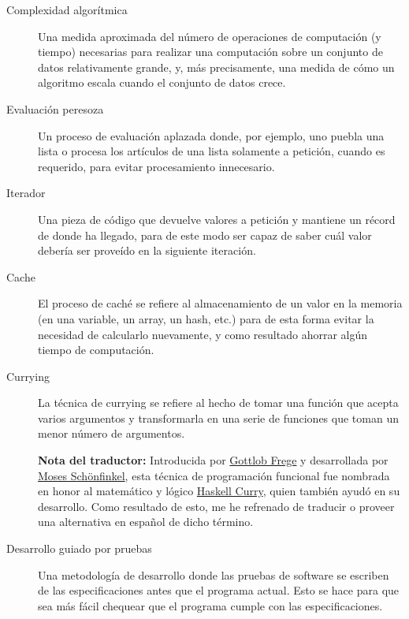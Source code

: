 \begin{description}
\item[Complexidad algorítmica] Una medida aproximada del número de operaciones 
de computación (y tiempo) necesarias para realizar una computación sobre
un conjunto de datos relativamente grande, y, más precisamente, una 
medida de cómo un algoritmo escala cuando el conjunto de datos 
crece.

\item[Evaluación peresoza] Un proceso de evaluación aplazada donde,
por ejemplo, uno puebla una lista o procesa los artículos de una 
lista solamente a petición, cuando es requerido, para evitar 
procesamiento innecesario.

\item[Iterador] Una pieza de código que devuelve valores a petición
y mantiene un récord de donde ha llegado, para de este modo ser
capaz de saber cuál valor debería ser proveído en la siguiente 
iteración.

\item[Cache] El proceso de caché se refiere al almacenamiento de un valor 
en la memoria (en una variable, un array, un hash, etc.) para de esta 
forma evitar la necesidad de calcularlo nuevamente, y como 
resultado ahorrar algún tiempo de computación.

\item[Currying] La técnica de currying se refiere al hecho de 
tomar una función que acepta varios argumentos y transformarla en 
una serie de funciones que toman un menor número de argumentos.

{\bfseries Nota del traductor:} Introducida por 
\href{https://es.wikipedia.org/wiki/Gottlob_Frege}{Gottlob Frege} y desarrollada por 
\href{https://es.wikipedia.org/wiki/Moses_Sch%C3%B6nfinkels}{Moses Schönfinkel}, esta 
técnica de programación funcional fue nombrada en honor al matemático y lógico 
\href{https://es.wikipedia.org/wiki/Haskell_Curry}{Haskell Curry}, 
quien también ayudó en su desarrollo. Como resultado de esto, 
me he refrenado de traducir o proveer una alternativa en español de dicho término.

\item[Desarrollo guiado por pruebas] Una metodología de desarrollo donde las
pruebas de software se escriben de las especificaciones antes que 
el programa actual. Esto se hace para que sea más fácil chequear que 
el programa cumple con las especificaciones.

\end{description}

